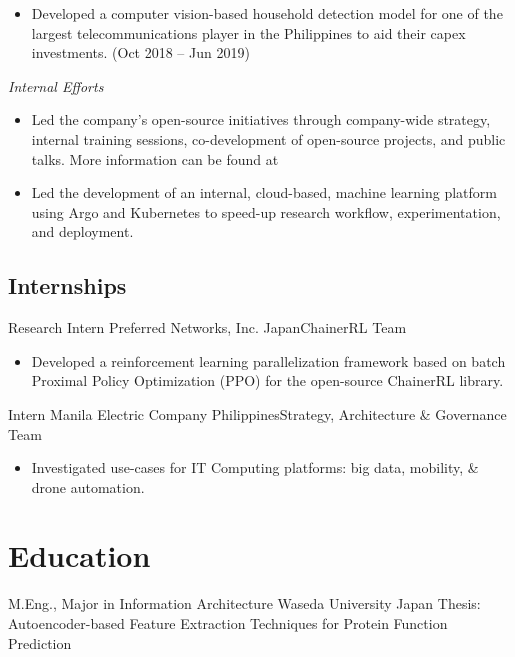 \documentclass[12pt,a4paper]{moderncv}
\begin{document}
{\begin{itemize}
            decisions. (Feb 2019 -- Apr 2019)
        \item Developed a computer vision-based household detection model for
            one of the largest telecommunications player in the Philippines to
            aid their capex investments. (Oct 2018 -- Jun 2019)
    \end{itemize}
    \vspace{3px}
    \textit{Internal Efforts}
    \begin{itemize}
        \item Led the company's open-source initiatives through
            company-wide strategy, internal training sessions, co-development
            of open-source projects, and public talks. More information can be
            found at {\color{blue}
            }
        \item Led the development of an internal, cloud-based, machine learning
            platform using Argo and Kubernetes to speed-up research workflow,
            experimentation, and deployment.
    \end{itemize}
}

\subsection{Internships}

{Research Intern}
{Preferred Networks, Inc.}
{Japan}{ChainerRL Team}
{
    \begin{itemize}
        \item Developed a reinforcement learning parallelization
              framework based on batch Proximal Policy Optimization (PPO)
              for the open-source ChainerRL library.
    \end{itemize}
}

{Intern}
{Manila Electric Company}
{Philippines}{Strategy, Architecture \& Governance Team}
{
    \begin{itemize}
        \item Investigated use-cases for IT Computing platforms: big
              data, mobility, \& drone automation.
    \end{itemize}
}


\section{Education}
{M.Eng., Major in Information Architecture}
{Waseda University}
{Japan}{}
{Thesis: Autoencoder-based Feature Extraction Techniques for Protein
    Function Prediction}
\end{document}
